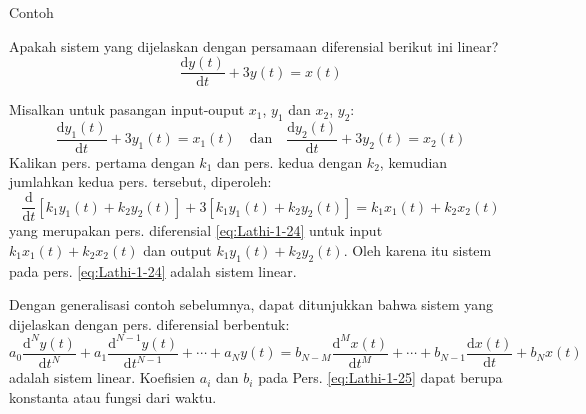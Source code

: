 \begin{frame}{Contoh}

\fontsize{9}{10}\selectfont

Apakah sistem yang dijelaskan dengan persamaan diferensial berikut ini linear?
\begin{equation}
\frac{\mathrm{d} y(t)}{\mathrm{d}t} + 3 y(t) = x(t)
\label{eq:Lathi-1-24}
\end{equation}

Misalkan untuk pasangan input-ouput $x_1$, $y_1$ dan $x_2$, $y_2$:
\begin{equation*}
\frac{\mathrm{d} y_{1}(t)}{\mathrm{d}t} + 3 y_{1}(t) = x_{1}(t) \quad \text{dan} \quad
\frac{\mathrm{d} y_{2}(t)}{\mathrm{d}t} + 3 y_{2}(t) = x_{2}(t)
\end{equation*}
Kalikan pers. pertama dengan $k_1$ dan pers. kedua dengan $k_2$, kemudian jumlahkan
kedua pers. tersebut, diperoleh:
$$
\frac{\mathrm{d}}{\mathrm{d}t} \left[
  k_{1} y_{1}(t) + k_{2} y_{2}(t) \right] +
3 \left[ k_{1} y_{1}(t) + k_{2} y_{2}(t) \right] =
k_{1} x_{1}(t) + k_{2} x_{2}(t)
$$
yang merupakan pers. diferensial \eqref{eq:Lathi-1-24} untuk input
$k_{1} x_{1}(t) + k_{2} x_{2}(t)$ dan output $k_{1} y_{1}(t) + k_{2} y_{2}(t)$.
Oleh karena itu sistem pada pers. \eqref{eq:Lathi-1-24} adalah sistem linear.

\end{frame}


\begin{frame}

Dengan generalisasi contoh sebelumnya, dapat ditunjukkan bahwa sistem yang dijelaskan
dengan pers. diferensial berbentuk:
\begin{equation}
a_0 \frac{\mathrm{d}^{N} y(t)}{\mathrm{d}t^{N}} + a_1 \frac{\mathrm{d}^{N-1} y(t)}{\mathrm{d}t^{N-1}} +
\cdots + a_{N} y(t) = b_{N-M} \frac{\mathrm{d}^{M} x(t)}{\mathrm{d}t^{M}} + \cdots +
b_{N-1} \frac{\mathrm{d} x(t)}{\mathrm{d}t} + b_{N} x(t)
\label{eq:Lathi-1-25}
\end{equation}
adalah sistem linear. Koefisien $a_{i}$ dan $b_{i}$ pada Pers. \eqref{eq:Lathi-1-25} dapat berupa
konstanta atau fungsi dari waktu.

\end{frame}


